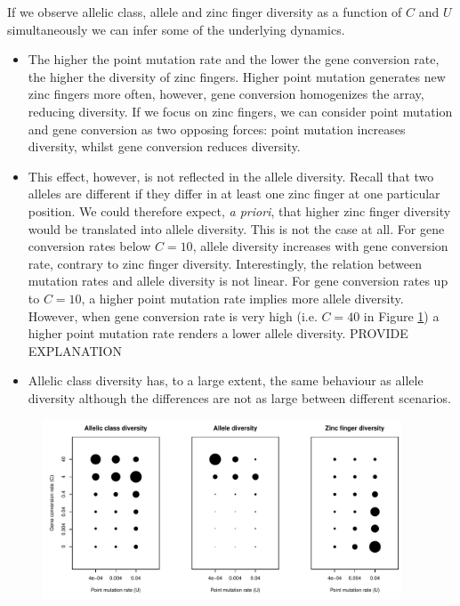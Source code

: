 \documentclass[a4paper,10pt]{article}
\begin{document}
If we observe allelic class, allele and zinc finger diversity as a function of $C$ and $U$ simultaneously we can infer some of the underlying dynamics.
\begin{itemize}
 \item The higher the point mutation rate and the lower the gene conversion rate, the higher the diversity of zinc fingers. Higher point mutation generates new zinc fingers more often, however, gene conversion homogenizes the array, reducing diversity. If we focus on zinc fingers, we can consider point mutation and gene conversion as two opposing forces: point mutation increases diversity, whilst gene conversion reduces diversity. 
 \item This effect, however, is not reflected in the allele diversity. Recall that two alleles are different if they differ in at least one zinc finger at one particular position. We could therefore expect, \textit{a priori}, that higher zinc finger diversity would be translated into allele diversity. This is not the case at all. For gene conversion rates below $C=10$, allele diversity increases with gene conversion rate, contrary to zinc finger diversity. 
 Interestingly, the relation between mutation rates and allele diversity is not linear. For gene conversion rates up to $C=10$, a higher point mutation rate implies more allele diversity. However, when gene conversion rate is very high (i.e. $C=40$ in Figure \ref{AllDiv}) a higher point mutation rate renders a lower allele diversity. 
 PROVIDE EXPLANATION
 \item Allelic class diversity has, to a large extent, the same behaviour as allele diversity although the differences are not as large between different scenarios. 

 \end{itemize}

 
\begin{figure}[htb]
\begin{center}
\leavevmode
\includegraphics[width=0.95\textwidth] {./Images/prdm9_allRate.pdf}
\end{center}
\caption{\small{}}
\label{AllDiv}
\end{figure}
\end{document}
